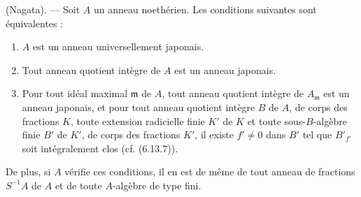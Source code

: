 \begin{theorem}[7.7.2]
(Nagata). --- Soit $A$ un anneau noethérien. Les conditions suivantes sont
équivalentes :
\begin{enumerate}
\item[\emph{a)}] $A$ est un anneau universellement japonais.
\item[\emph{b)}] Tout anneau quotient intègre de $A$ est un anneau japonais.
\item[\emph{c)}] Pour tout idéal maximal $\mathfrak m$ de $A$, tout anneau
quotient intègre de $A_{\mathfrak m}$ est un anneau japonais, et pour tout
anneau quotient intègre $B$ de $A$, de corps des fractions $K$, toute
extension radicielle finie $K'$ de $K$ et toute sous-$B$-algèbre finie $B'$ de
$K'$, de corps des fractions $K'$, il existe $f'\neq0$ dans $B'$ tel que
$B'_{f'}$ soit intégralement clos \textup{(cf. (6.13.7))}.
\end{enumerate}

De plus, si $A$ vérifie ces conditions, il en est de même de tout anneau de
fractions $S^{-1}A$ de $A$ et de toute $A$-algèbre de type fini.
\end{theorem}

